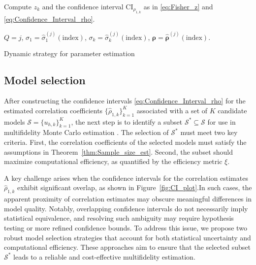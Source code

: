 \begin{algorithm}[!ht]
{{    Compute $z_k$ and the confidence interval $\text{CI}_{\rho_{1,k}}$ as in \eqref{eq:Fisher_z} and \eqref{eq:Confidence_Interval_rho}.
    

    
    {
    }
    }
    
    
    }    
    
    $Q=j$, $\sigma_1 = \widehat\sigma_1^{(j)}(\text{index})$, $\sigma_k = \widehat\sigma_k^{(j)}(\text{index})$, $\boldsymbol{\rho} = \widehat{\boldsymbol{\rho}}^{(j)}(\text{index})$.
\caption{Dynamic strategy for parameter estimation}\label{algo:Parameter_Estimation}
\end{algorithm}


\subsection{Model selection}\label{sec:Model_Selection}
After constructing the confidence intervals \eqref{eq:Confidence_Interval_rho} for the estimated correlation coefficients $\{\widehat\rho_{1,k}\}_{k=1}^{K}$ 
associated with a set of $K$ candidate models $\mathcal{S}=\{ u_{h, k}\}_{k=1}^K$, the next step is to identify a subset $\mathcal{S}^* \subseteq \mathcal{S}$ for use in multifidelity Monte Carlo estimation \cite{PeWiGu:2016}. The selection of $\mathcal{S}^*$ must meet two key criteria. First, the correlation coefficients of the selected models must satisfy the assumptions in Theorem~\ref{thm:Sample_size_est}. Second, the subset should maximize computational efficiency, as quantified by the efficiency metric $\xi$.

A key challenge arises when the confidence intervals for the correlation estimates ${\widehat\rho_{1,k}}$ exhibit significant overlap, as shown in Figure~\ref{fig:CI_plot}.In such cases, the apparent proximity of correlation estimates may obscure meaningful differences in model quality. Notably, overlapping confidence intervals do not necessarily imply statistical equivalence, and resolving such ambiguity may require hypothesis testing or more refined confidence bounds. To address this issue, we propose two robust model selection strategies that account for both statistical uncertainty and computational efficiency. These approaches aim to ensure that the selected subset $\mathcal{S}^*$ leads to a reliable and cost-effective multifidelity estimation.
\newline 

